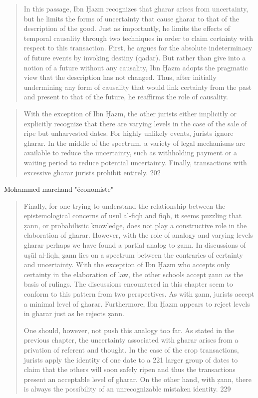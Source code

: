 \begin{quote}
In this passage, Ibn Ḥazm recognizes that gharar arises from uncertainty, but he limits
the forms of uncertainty that cause gharar to that of the description of the good. Just as
importantly, he limits the effects of temporal causality through two techniques in order to
claim certainty with respect to this transaction. First, he argues for the absolute
indeterminacy of future events by invoking destiny (qadar). But rather than give into a
notion of a future without any causality, Ibn Ḥazm adopts the pragmatic view that the
description has not changed. Thus, after initially undermining any form of causality that
would link certainty from the past and present to that of the future, he reaffirms the role
of causality.
\end{quote}


\begin{quote}
    With the exception of Ibn Ḥazm, the other jurists either implicitly or explicitly recognize
that there are varying levels in the case of the sale of ripe but unharvested dates. For
highly unlikely events, jurists ignore gharar. In the middle of the spectrum, a variety of
legal mechanisms are available to reduce the uncertainty, such as withholding payment or
a waiting period to reduce potential uncertainty. Finally, transactions with excessive
gharar jurists prohibit entirely. 202
\end{quote}

Mohammed marchand "économiste"


\begin{quote}
    Finally, for one trying to understand the relationship between the epistemological
concerns of uṣūl al-fiqh and fiqh, it seems puzzling that ẓann, or probabilistic knowledge,
does not play a constructive role in the elaboration of gharar. However, with the role of
analogy and varying levels gharar perhaps we have found a partial analog to ẓann. In
discussions of uṣūl al-fiqh, ẓann lies on a spectrum between the contraries of certainty
and uncertainty. With the exception of Ibn Ḥazm who accepts only certainty in the
elaboration of law, the other schools accept ẓann as the basis of rulings. The discussions
encountered in this chapter seem to conform to this pattern from two perspectives. As
with ẓann, jurists accept a minimal level of gharar. Furthermore, Ibn Ḥazm appears to
reject levels in gharar just as he rejects ẓann. 

One should, however, not push this analogy too far. As stated in the previous
chapter, the uncertainty associated with gharar arises from a privation of referent and
thought. In the case of the crop transactions, jurists apply the identity of one date to a
221
larger group of dates to claim that the others will soon safely ripen and thus the
transactions present an acceptable level of gharar. On the other hand, with ẓann, there is
always the possibility of an unrecognizable mistaken identity.
229
\end{quote}

